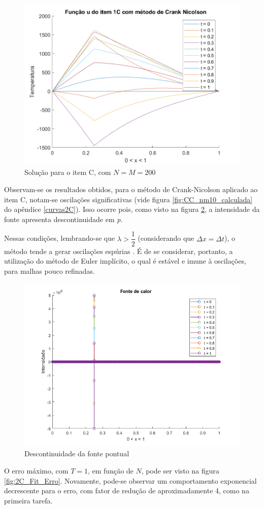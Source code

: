 \documentclass[12pt]{article}
\begin{document}
\begin{spacing}{1.5}
\begin{figure}[ht!]
    \centering
    \includegraphics[width=0.45\linewidth]{Segunda_Tarefa/ItemC/itemC_2D.png}
    \caption{Solução para o item C, com $N=M=200$}
    \label{fig:Tarefa2C_itemC_2D}
\end{figure}

Observam-se os resultados obtidos, para o método de Crank-Nicolson aplicado ao item C, notam-se oscilações significativas (vide figura \ref{fig:CC_nm10_calculada} do apêndice \ref{curvas2C}). Isso ocorre pois, como visto na figura \ref{fig:fonte_pontual}, a intensidade da fonte apresenta descontinuidade em \textit{p}. 

Nessas condições, lembrando-se que $\lambda > \dfrac{1}{2}$ (considerando que $\Delta x = \Delta t$), o método tende a gerar oscilações espúrias \supercite{osterby}. É de se considerar, portanto, a utilização do método de Euler implícito, o qual é estável e imune à oscilações, para malhas pouco refinadas.
\vspace{0.2cm}
\begin{figure}[H]
    \centering
    \includegraphics[width=0.7\linewidth]{Segunda_Tarefa/ItemC/fonte.png}
    \caption{Descontinuidade da fonte pontual}
    \label{fig:fonte_pontual}
\end{figure}

O erro máximo, com $T=1$, em função de $N$, pode ser visto na figura \ref{fig:2C_Fit_Erro}. Novamente, pode-se observar um comportamento exponencial decrescente para o erro, com fator de redução de aproximadamente 4, como na primeira tarefa.



\end{spacing}
\end{document}

